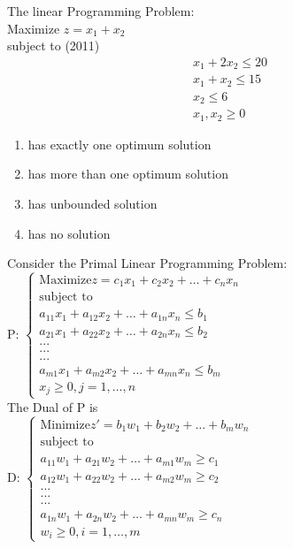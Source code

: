
\iffalse
\chapter{2011}
\author{AI24BTECH11008}
\section{ph}
\fi

    \item The linear Programming Problem:\\Maximize $z=x_1+x_2$\\subject to \hfill (2011)
    \begin{align*}
     x_1 + 2x_2 \leq 20\\
     x_1 + x_2 \leq 15\\
     x_2\leq 6\\
     x_1, x_2 \geq 0
    \end{align*}
    \begin{enumerate}[label=(\Alph*)]
        \item has exactly one optimum solution
        \item has more than one optimum solution
        \item has unbounded solution
        \item has no solution
    \end{enumerate}
    \item Consider the Primal Linear Programming Problem:\\
    P: $\begin{cases} \text{Maximize} z = c_1x_1+c_2x_2+\ldots+c_nx_n\\\text{subject to}\\a_{11}x_1+a_{12}x_2+\ldots+a_{1n}x_n \leq b_1\\a_{21}x_1+a_{22}x_2+\ldots+a_{2n}x_n \leq b_2\\.      .      .\\.      .      .\\.      .      .\\a_{m1}x_1+a_{m2}x_2+\ldots+a_{mn}x_n \leq b_m\\ x_j \geq 0, j=1,\ldots,n\end{cases}$
    \\The Dual of P is\\
    D: $\begin{cases} \text{Minimize} z' = b_1w_1+b_2w_2+\ldots+b_mw_n\\\text{subject to}\\a_{11}w_1+a_{21}w_2+\ldots+a_{m1}w_m \geq c_1\\a_{12}w_1+a_{22}w_2+\ldots+a_{m2}w_m \geq c_2\\.      .      .\\.      .      .\\.      .      .\\a_{1n}w_1+a_{2n}w_2+\ldots+a_{mn}w_m \geq c_n\\ w_i \geq 0, i=1,\ldots,m\end{cases}$
